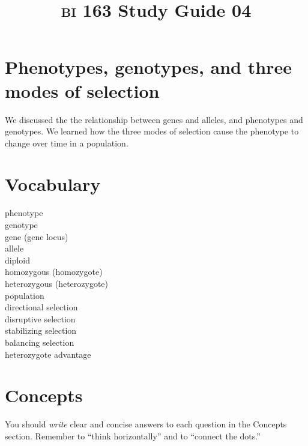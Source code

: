 \documentclass[letterpaper]{tufte-handout}
\title{{\scshape bi} 163 Study Guide 04}
\date{} %
\begin{document}
\maketitle	%

\section*{Phenotypes, genotypes, and three modes of selection}

We discussed the the relationship between genes and alleles, and phenotypes and genotypes. We learned how the three modes of selection cause the phenotype to change over time in a population.

\section*{Vocabulary}

\vspace{-1\baselineskip}
\begin{multicols}{2}
phenotype \\
genotype \\
gene (gene locus)\\
allele\\
diploid\\
homozygous (homozygote)\\
heterozygous (heterozygote)\\
population\\
directional selection\\
disruptive selection\\
stabilizing selection\\
balancing selection\\
heterozygote advantage

\end{multicols}

\section*{Concepts}

You should \emph{write} clear and concise answers to each question in the Concepts section.  Remember to ``think horizontally'' and to ``connect the dots.'' 
\end{document}
